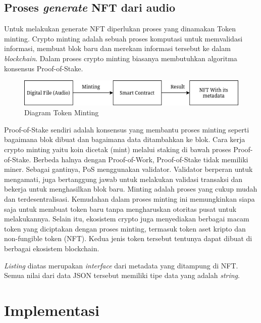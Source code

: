 \subsection{Proses \emph{generate} NFT dari audio}

Untuk melakukan generate NFT diperlukan proses yang dinamakan Token minting.
Crypto minting adalah sebuah proses komputasi untuk memvalidasi informasi, membuat blok baru dan merekam informasi tersebut ke dalam \emph{blockchain}.
Dalam proses crypto minting biasanya membutuhkan algoritma konsensus Proof-of-Stake.

\begin{figure} [ht] \centering
  \includegraphics[scale=0.55]{gambar/mintingtoken.png}
  \caption{Diagram Token Minting}
  \label{fig:mintingtoken}
\end{figure}

Proof-of-Stake sendiri adalah konsensus yang membantu proses minting seperti bagaimana blok dibuat dan bagaimana data ditambahkan ke blok. Cara kerja crypto minting yaitu koin dicetak (mint) melalui staking di bawah proses Proof-of-Stake. Berbeda halnya dengan Proof-of-Work, Proof-of-Stake tidak memiliki miner. Sebagai gantinya, PoS menggunakan validator. Validator berperan untuk mengamati, juga bertanggung jawab untuk melakukan validasi transaksi dan bekerja untuk menghasilkan blok baru.
Minting adalah proses yang cukup mudah dan terdesentralisasi. Kemudahan dalam proses  minting ini memungkinkan siapa saja untuk membuat token baru tanpa mengharuskan otoritas pusat untuk melakukannya.
Selain itu, ekosistem crypto juga menyediakan berbagai macam token yang diciptakan dengan proses minting, termasuk token aset kripto dan non-fungible token (NFT). Kedua jenis token tersebut tentunya dapat dibuat di berbagai ekosistem blockchain.

\emph{Listing} diatas merupakan \emph{interface} dari metadata yang ditampung di NFT. Semua nilai dari data JSON tersebut
memiliki tipe data yang adalah \emph{string}.

\section{Implementasi}

